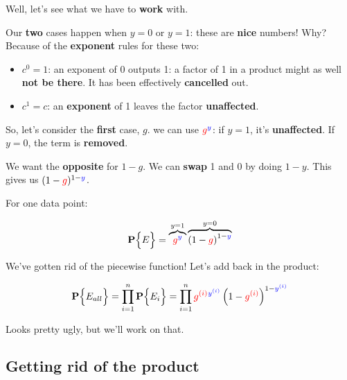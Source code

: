         Well, let's see what we have to \textbf{work} with.
        
        Our \textbf{two} cases happen when $y=0$ or $y=1$: these are \textbf{nice} numbers! Why? Because of the \textbf{exponent} rules for these two:
        
        \begin{itemize}
            \item $c^0=1$: an exponent of 0 outputs 1: a factor of 1 in a product might as well \textbf{not be there}. It has been effectively \textbf{cancelled} out.
            
            \item $c^1=c$: an \textbf{exponent} of 1 leaves the factor \textbf{unaffected}.
        \end{itemize}
        
        So, let's consider the \textbf{first} case, $g$. we can use $\textcolor{red}{g}^{ \textcolor{blue}{y} }$: if $y=1$, it's \textbf{unaffected}. If $y=0$, the term is \textbf{removed}.
        
        We want the \textbf{opposite} for $1-g$. We can \textbf{swap} 1 and 0 by doing $1-y$. This gives us $(1-\textcolor{red}{g})^{ 1-\textcolor{blue}{y} }$.
        
        For one data point:
        
        \begin{equation}
            \mathbf{P} \Bigl\{E\Bigr\} = 
            \overbrace{
                \textcolor{red}{g} ^ { \textcolor{blue}{y} } 
            }^{y=1}
            \overbrace{
                \left( 
                    1-\textcolor{red}{g} 
                \right) 
                ^ { 1-\textcolor{blue}{y} }
            }^{y=0}
        \end{equation}
        
        We've gotten rid of the piecewise function! Let's add back in the product:
        
        \begin{equation}
            \mathbf{P} \Bigl\{E_{all}\Bigr\} = 
            \prod_{i = 1}^n
            \mathbf{P} \Bigl\{E_i\Bigr\}
            =
            \prod_{i = 1}^n
            \textcolor{red}{g^{(i)}} ^ {\textcolor{blue}{y^{(i)} }}
            \left( 
                1-\textcolor{red}{g^{(i)}} 
            \right) 
            ^ { 1 - \textcolor{blue}{y^{(i)} } }
        \end{equation}
        
        Looks pretty ugly, but we'll work on that.
        
    \subsection{Getting rid of the product}
    
